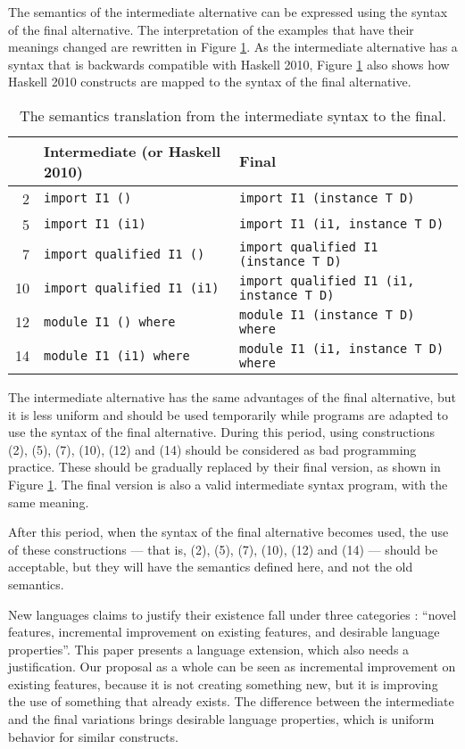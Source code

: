 \documentclass[msc]{ppgccufmg}
\begin{document}
The semantics of the intermediate alternative can be expressed using the syntax
of the final
alternative.  The interpretation of the examples that have their meanings changed
are rewritten in Figure \ref{tab}.  As the intermediate alternative has a syntax
that is backwards
compatible with Haskell 2010, Figure \ref{tab} also shows how Haskell 2010
constructs are mapped to the syntax of the final alternative.

\begin{table}
\caption{The semantics translation from the intermediate syntax to the
  final.\label{tab}}
\begin{tabular}{|r|l|l|}
\hline
& \textbf{Intermediate (or Haskell 2010)} & \textbf{Final} \\
\hline
2 & \texttt{import I1 ()} & \texttt{import I1 (instance T D)}\\
5 & \texttt{import I1 (i1)} & \texttt{import I1 (i1, instance T D)}\\
7 & \texttt{import qualified I1 ()} & \texttt{import qualified I1 (instance T D)}\\
10 & \texttt{import qualified I1 (i1)} & \texttt{import qualified I1 (i1, instance T D)}\\
12 & \texttt{module I1 () where} & \texttt{module I1 (instance T D) where}\\
14 & \texttt{module I1 (i1) where} & \texttt{module I1 (i1, instance T D)
    where}\\
\hline
\end{tabular}
\end{table}

The intermediate alternative has the same advantages of the final alternative, but it is less
uniform and should be used temporarily while programs are adapted to use
the syntax of the final alternative.  During this period, using constructions (2), (5), (7), (10), (12) and (14)
should be considered as bad programming practice.  These should be gradually
replaced by their final version, as shown in Figure \ref{tab}.  The final
version is also a valid intermediate syntax program, with the same meaning.

After this period, when the syntax of the final alternative becomes used, the use of these
constructions --- that is, (2), (5), (7), (10), (12) and (14) --- should be acceptable, but
they will have the semantics defined here, and not the old semantics.

New languages claims to justify their
existence fall under three categories \citep[p.~1]{claims}: ``novel features, incremental improvement on
existing features, and desirable language properties''.  This paper presents
a language extension, which also needs a justification.  Our proposal as a whole can be seen as incremental improvement
on existing features, because it is not creating something new, but it is
improving the use of something that already exists.  The difference between the
intermediate and the final variations brings desirable language properties, which is
uniform behavior for similar constructs.
\end{document}
